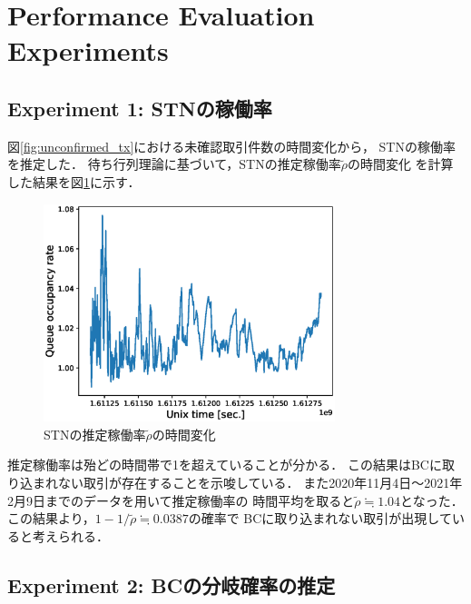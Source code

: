 \documentclass[graybox]{svmult}
\begin{document}
\section{Performance Evaluation Experiments}
\label{sec:experiments}


\subsection{Experiment 1: STNの稼働率}
\label{sec:occupancyrate}

図\ref{fig:unconfirmed_tx}における未確認取引件数の時間変化から，
STNの稼働率を推定した．
待ち行列理論に基づいて，STNの推定稼働率$\tilde{\rho}$の時間変化
を計算した結果を図\ref{fig:occupancyrate}に示す．
%
\begin{figure}[tb]
  \vspace{-45mm}
  \begin{center}
    \includegraphics[width=85mm]{bsv_stn-rho-queue_occupancy_rate.eps}
  \end{center}
  \vspace{45mm}
  \caption{STNの推定稼働率$\tilde{\rho}$の時間変化}
  \label{fig:occupancyrate}
\end{figure}
%
推定稼働率は殆どの時間帯で1を超えていることが分かる．
この結果はBCに取り込まれない取引が存在することを示唆している．
また2020年11月4日〜2021年2月9日までのデータを用いて推定稼働率の
時間平均を取ると$\tilde{\rho} \fallingdotseq 1.04$となった．
この結果より，$1-1/\tilde{\rho} \fallingdotseq 0.0387$の確率で
BCに取り込まれない取引が出現していると考えられる．








\subsection{Experiment 2: BCの分岐確率の推定}
\label{sec:sork}
\end{document}
